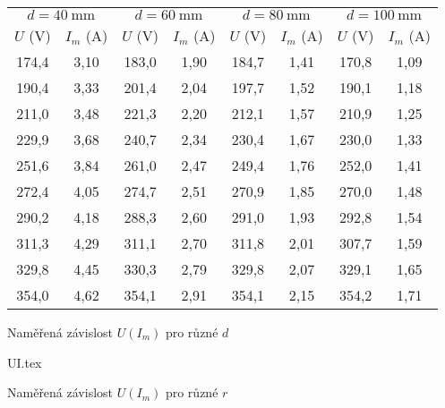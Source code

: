 \begin{tabulka}[htbp]
\centering
\begin{tabular}{cc|cc|cc|cc}
\multicolumn{2}{c|}{$d=\SI{40}{\mm}$} & \multicolumn{2}{c|}{$d=\SI{60}{\mm}$} &\multicolumn{2}{c|}{$d=\SI{80}{\mm}$} & \multicolumn{2}{c}{$d=\SI{100}{\mm}$} \\
$U$ (\si{\volt}) & $I_m$ (\si{\ampere}) & $U$ (\si{\volt}) & $I_m$ (\si{\ampere}) & $U$ (\si{\volt}) & $I_m$ (\si{\ampere}) & $U$ (\si{\volt}) & $I_m$ (\si{\ampere}) \\ \hline 
174,4 & 3,10 & 183,0 & 1,90 & 184,7 & 1,41 & 170,8 & 1,09 \\ 
190,4 & 3,33 & 201,4 & 2,04 & 197,7 & 1,52 & 190,1 & 1,18 \\ 
211,0 & 3,48 & 221,3 & 2,20 & 212,1 & 1,57 & 210,9 & 1,25 \\ 
229,9 & 3,68 & 240,7 & 2,34 & 230,4 & 1,67 & 230,0 & 1,33 \\ 
251,6 & 3,84 & 261,0 & 2,47 & 249,4 & 1,76 & 252,0 & 1,41 \\ 
272,4 & 4,05 & 274,7 & 2,51 & 270,9 & 1,85 & 270,0 & 1,48 \\ 
290,2 & 4,18 & 288,3 & 2,60 & 291,0 & 1,93 & 292,8 & 1,54 \\ 
311,3 & 4,29 & 311,1 & 2,70 & 311,8 & 2,01 & 307,7 & 1,59 \\ 
329,8 & 4,45 & 330,3 & 2,79 & 329,8 & 2,07 & 329,1 & 1,65 \\ 
354,0 & 4,62 & 354,1 & 2,91 & 354,1 & 2,15 & 354,2 & 1,71 \\ 
\end{tabular}
\caption{Naměřená závislost $U(I_m)$ pro různé $d$}
\label{t:vysledky}
\end{tabulka}

\begin{graph}[htbp] 
\centering
{UI.tex}
\caption{Naměřená závislost $U(I_m)$ pro různé $r$}
\label{g:vysledky}
\end{graph}
